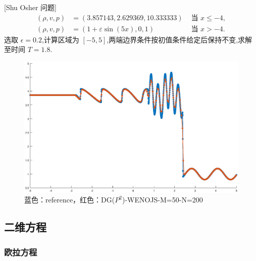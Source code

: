 \documentclass{book}
\begin{document}
\begin{example}{}{}

    [Shu Osher 问题\cite{RN109}]
    \begin{equation}
        \begin{aligned}
            (\rho, v, p) & =(3.857143,2.629369,10.333333)   & \text { 当 } x \leq-4, \\
            (\rho, v, p) & =(1+\varepsilon \sin (5 x), 0,1) & \text { 当 } x>-4 .
        \end{aligned}
    \end{equation}
    选取 $\epsilon = 0.2$,计算区域为 $[-5,5]$,两端边界条件按初值条件给定后保持不变,求解至时间 $T=1.8$.
    \begin{figure}[H]
        \centering
        \label{fig:}
        \includegraphics[width=0.7\linewidth]{fig/shu_osher.eps}
        \caption{蓝色：reference，红色：DG($P^2$)-WENOJS-M=50-N=200}
    \end{figure}

\end{example}

\subsection{二维方程}
\subsubsection{欧拉方程}
\end{document}
